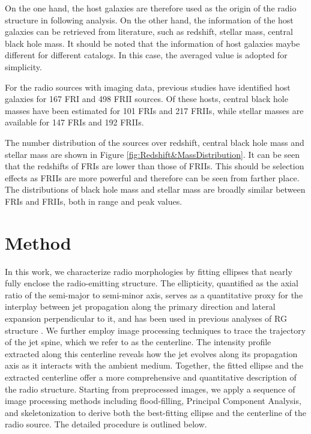 \documentclass{aa}
\begin{document}
On  the one hand, the host galaxies are therefore used as the origin of the radio structure in following analysis.
On the other hand,  the information of the host galaxies can be retrieved from literature, such as redshift, stellar mass, central black hole mass.  It should be noted that the information of host galaxies maybe different for different catalogs. In this case, the averaged value is adopted for simplicity. 

For the radio sources with imaging data, previous studies have identified host galaxies for 167 FRI and 498 FRII sources. Of these hosts, central black hole masses have been estimated for 101 FRIs and 217 FRIIs, while stellar masses are available for 147 FRIs and 192 FRIIs.

The number distribution of the sources over redshift, central black hole mass and stellar mass are shown in Figure \ref{fig:Redshift&MassDistribution}. 
It can be seen that the redshifts of FRIs are lower than those of FRIIs. This should be selection effects as FRIIs are more powerful and therefore can be seen from farther place.
The distributions of black hole mass and stellar mass are broadly similar between FRIs and FRIIs, both in range and peak values.



\section{Method}\label{sec:Method}

In this work, we characterize radio morphologies by fitting ellipses that nearly fully enclose the radio-emitting structure. The ellipticity, quantified as the axial ratio of the semi-major to semi-minor axis, serves as a quantitative proxy for the interplay between jet propagation along the primary direction and lateral expansion perpendicular to it, and has been used in previous analyses of RG structure \citep[e.g.,][]{lin_new_2024, carilli_cygnus_1996, begelman_overpressured_1989}.
We further employ image processing techniques to trace the trajectory of the jet spine, which we refer to as the centerline. The intensity profile extracted along this centerline reveals how the jet evolves along its propagation axis as it interacts with the ambient medium. Together, the fitted ellipse and the extracted centerline offer a more comprehensive and quantitative description of the radio structure.
Starting from preprocessed images, we apply a sequence of image processing methods including flood-filling, Principal Component Analysis, and skeletonization to derive both the best-fitting ellipse and the centerline of the radio source. The detailed procedure is outlined below.
\end{document}
